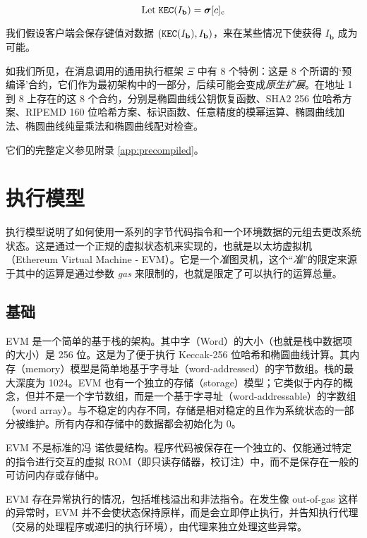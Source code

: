 \documentclass[9pt,oneside]{amsart}
\begin{document}
\begin{multicols}{2}
\begin{equation}
\text{Let} \; \mathtt{\tiny KEC}(I_{\mathbf{b}}) = \boldsymbol{\sigma}[c]_{\mathrm{c}}
\end{equation}

我们假设客户端会保存键值对数据 $(\mathtt{\tiny KEC}(I_{\mathbf{b}}), I_{\mathbf{b}})$，来在某些情况下使获得 $I_{\mathbf{b}}$ 成为可能。

如我们所见，在消息调用的通用执行框架 $\Xi$ 中有 8 个特例：这是 8 个所谓的‘预编译’合约，它们作为最初架构中的一部分，后续可能会变成\textit{原生扩展}。在地址 1 到 8 上存在的这 8 个合约，分别是椭圆曲线公钥恢复函数、SHA2 256 位哈希方案、RIPEMD 160 位哈希方案、标识函数、任意精度的模幂运算、椭圆曲线加法、椭圆曲线纯量乘法和椭圆曲线配对检查。

它们的完整定义参见附录 \ref{app:precompiled}。

\section{执行模型} \label{ch:model}

执行模型说明了如何使用一系列的字节代码指令和一个环境数据的元组去更改系统状态。这是通过一个正规的虚拟状态机来实现的，也就是以太坊虚拟机（Ethereum Virtual Machine - EVM）。它是一个\textit{准}图灵机，这个“\textit{准}”的限定来源于其中的运算是通过参数 \textit{gas} 来限制的，也就是限定了可以执行的运算总量。

\subsection{基础}

EVM 是一个简单的基于栈的架构。其中字（Word）的大小（也就是栈中数据项的大小）是 256 位。这是为了便于执行 Keccak-256 位哈希和椭圆曲线计算。其内存（memory）模型是简单地基于字寻址（word-addressed）的字节数组。栈的最大深度为 1024。EVM 也有一个独立的存储（storage）模型；它类似于内存的概念，但并不是一个字节数组，而是一个基于字寻址（word-addressable）的字数组（word array）。与不稳定的内存不同，存储是相对稳定的且作为系统状态的一部分被维护。所有内存和存储中的数据都会初始化为 0。

EVM 不是标准的冯 诺依曼结构。程序代码被保存在一个独立的、仅能通过特定的指令进行交互的虚拟 ROM（即只读存储器，校订注）中，而不是保存在一般的可访问内存或存储中。

EVM 存在异常执行的情况，包括堆栈溢出和非法指令。在发生像 out-of-gas 这样的异常时，EVM 并不会使状态保持原样，而是会立即停止执行，并告知执行代理（交易的处理程序或递归的执行环境），由代理来独立处理这些异常。


\end{multicols}
\end{document}
